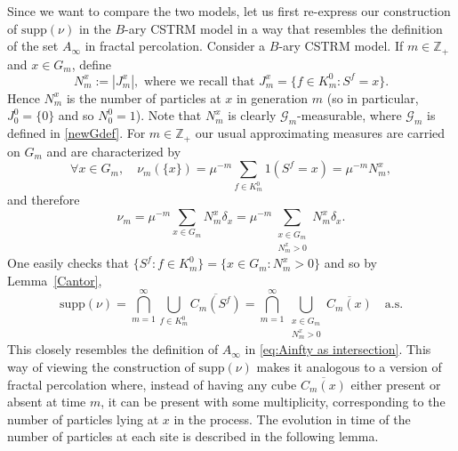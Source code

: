 \documentclass[12pt]{article}
\numberwithin{theorem}{section}
\theoremstyle{def}
\numberwithin{equation}{section}
\newcommand{\Z}{\mathbb{Z}}
\newcommand{\cG}{\mathcal G}
\newcommand{\supp}{\mathrm{supp}}
\begin{document}
\medskip

Since we want to compare the two models, let us first re-express our construction of $\supp (\nu)$ in the $B$-ary CSTRM model in a way that resembles the definition of the set $A_\infty$ in fractal percolation. 
Consider a $B$-ary CSTRM model.
If $m\in\Z_+$ and $x\in G_m$, define
\begin{equation}\label{Nmxdef}
	N_m^x:=|J_m^x|,\text{ where we recall that }J_m^x=\{f\in K^0_m:S^f=x\}.
\end{equation}
Hence $N_m^x$ is the number of particles at $x$ in generation $m$ (so in particular, $J_0^0=\{0\}$ and so $N_0^0=1$).
Note that $N_m^x$ is clearly $\cG_m$-measurable, where $\cG_m$ is defined in \eqref{newGdef}.  
For $m\in\Z_+$ our usual approximating measures are carried on $G_m$ and are characterized by 
\[
\forall x\in G_m, \quad \nu_m(\{x\})=\mu^{-m}\sum_{f\in K_m^0}1(S^f=x)=\mu^{-m} N_m^x,
\]
and therefore
\begin{equation}\label{numdef2}
	\nu_m=\mu^{-m}\sum_{x\in G_m} N_m^x \delta_{x}= \mu^{-m}\sum_{\substack{x\in G_m \\ N_m^x>0}} N_m^x \delta_{x}.
\end{equation}
One easily checks that $\{S^f:f\in K^0_m\}=\{x \in G_m: N_m^x>0\}$
and so by Lemma~\ref{Cantor},
\begin{equation}\label{suppNalpha}
	\supp(\nu)=\bigcap_{m=1}^\infty\bigcup_{f\in K^0_m} \overline{C_m(S^f)}
	=\bigcap_{m=1}^\infty\bigcup_{\substack{x\in G_m \\ N_m^x>0}}\overline{C_m(x)}\quad\text{a.s.}
\end{equation}
This closely resembles the definition of $A_\infty$ in \eqref{eq:Ainfty as intersection}. 
This way of viewing the construction of $\supp(\nu)$ makes it analogous to a version of fractal percolation where, instead of having any cube $\overline{C_m(x)}$ either present or absent at time $m$, it can be present with some multiplicity, corresponding to the number of particles lying at $x$ in the process. 
The evolution in time of the number of particles at each site is described in the following lemma.
\end{document}
